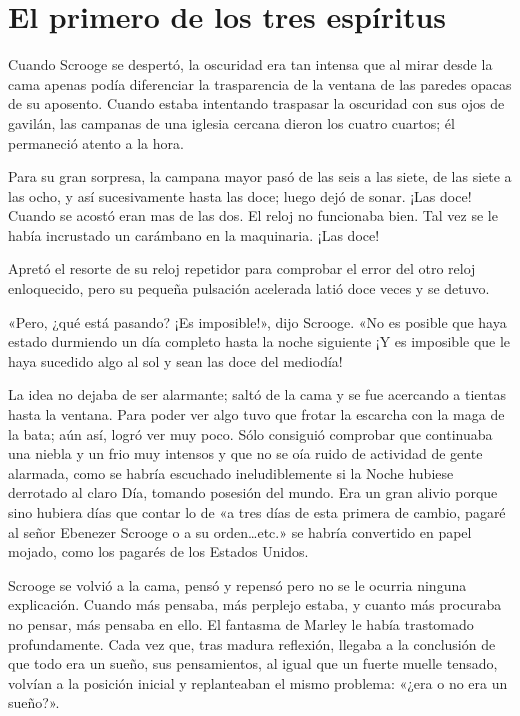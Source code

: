 \documentclass{novela}
\begin{document}
 \chapter{El primero de los tres espíritus}



 Cuando Scrooge se despertó, la oscuridad era tan intensa que al mirar desde la cama apenas podía diferenciar la trasparencia de la ventana de las paredes opacas de su aposento. Cuando estaba intentando traspasar la oscuridad con sus ojos de gavilán, las campanas de una iglesia cercana dieron los cuatro cuartos; él permaneció atento a la hora.

 Para su gran sorpresa, la campana mayor pasó de las seis a las siete, de las siete a las ocho, y así sucesivamente hasta las doce; luego dejó de sonar. ¡Las doce! Cuando se acostó eran mas de las dos. El reloj no funcionaba bien. Tal vez se le había incrustado un carámbano en la maquinaria. ¡Las doce!

 Apretó el resorte de su reloj repetidor para comprobar el error del otro reloj enloquecido, pero su pequeña pulsación acelerada latió doce veces y se detuvo.

 «Pero, ¿qué está pasando? ¡Es imposible!», dijo Scrooge. «No es posible que haya estado durmiendo un día completo hasta la noche siguiente ¡Y es imposible que le haya sucedido algo al sol y sean las doce del mediodía!

 La idea no dejaba de ser alarmante; saltó de la cama y se fue acercando a tientas hasta la ventana. Para poder ver algo tuvo que frotar la escarcha con la maga de la bata; aún así, logró ver muy poco. Sólo consiguió comprobar que continuaba una niebla y un frio muy intensos y que no se oía ruido de actividad de gente alarmada, como se habría escuchado ineludiblemente si la Noche hubiese derrotado al claro Día, tomando posesión del mundo. Era un gran alivio porque sino hubiera días que contar lo de «a tres días de esta primera de cambio, pagaré al señor Ebenezer Scrooge o a su orden{\ldots}etc.» se habría convertido en papel mojado, como los pagarés de los Estados Unidos.

 Scrooge se volvió a la cama, pensó y repensó pero no se le ocurria ninguna explicación. Cuando más pensaba, más perplejo estaba, y cuanto más procuraba no pensar, más pensaba en ello. El fantasma de Marley le había trastomado profundamente. Cada vez que, tras madura reflexión, llegaba a la conclusión de que todo era un sueño, sus pensamientos, al igual que un fuerte muelle tensado, volvían a la posición inicial y replanteaban el mismo problema: «¿era o no era un sueño?».
\end{document}
